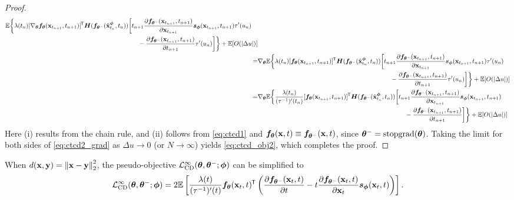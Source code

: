 \begin{appendices}
\begin{proof}
\begin{align}
\begin{multlined}[t][0.9\displaywidth]
            \mbb{E}\bigg\{\lambda(t_n)[\nabla_\vtheta \vf_\vtheta(\rvx_{t_{n+1}}, t_{n+1})]\tran \mH(\vf_{\vtheta^{-}}(\hat{\rvx}_{t_n}^\vphi, t_n))\bigg[t_{n+1} \frac{\partial \vf_{\vtheta^-}(\rvx_{t_{n+1}}, t_{n+1})}{\partial \rvx_{t_{n+1}}}\vs_\vphi(\rvx_{t_{n+1}}, t_{n+1})\tau'(u_{n}) \\ - \frac{\partial \vf_{\vtheta^-}(\rvx_{t_{n+1}}, t_{n+1})}{\partial t_{n+1}}\tau'(u_{n})\bigg]\bigg\} + \mbb{E}[O(|\Delta u|)]
        \end{multlined}\notag \\
        =&\!\begin{multlined}[t][0.9\displaywidth]
            \nabla_\vtheta \mbb{E}\bigg\{\lambda(t_n)[\vf_\vtheta(\rvx_{t_{n+1}}, t_{n+1})]\tran \mH(\vf_{\vtheta^{-}}(\hat{\rvx}_{t_n}^\vphi, t_n))\bigg[t_{n+1} \frac{\partial \vf_{\vtheta^-}(\rvx_{t_{n+1}}, t_{n+1})}{\partial \rvx_{t_{n+1}}}\vs_\vphi(\rvx_{t_{n+1}}, t_{n+1})\tau'(u_{n}) \\ - \frac{\partial \vf_{\vtheta^-}(\rvx_{t_{n+1}}, t_{n+1})}{\partial t_{n+1}}\tau'(u_{n})\bigg]\bigg\} + \mbb{E}[O(|\Delta u|)]
        \end{multlined}\\\notag
        =&\!\begin{multlined}[t][0.9\displaywidth]
            \nabla_\vtheta \mbb{E}\bigg\{\frac{\lambda(t_n)}{(\tau^{-1})'(t_{n})}[\vf_\vtheta(\rvx_{t_{n+1}}, t_{n+1})]\tran \mH(\vf_{\vtheta^{-}}(\hat{\rvx}_{t_n}^\vphi, t_n))\bigg[t_{n+1} \frac{\partial \vf_{\vtheta^-}(\rvx_{t_{n+1}}, t_{n+1})}{\partial \rvx_{t_{n+1}}}\vs_\vphi(\rvx_{t_{n+1}}, t_{n+1}) \\ - \frac{\partial \vf_{\vtheta^-}(\rvx_{t_{n+1}}, t_{n+1})}{\partial t_{n+1}}\bigg]\bigg\} + \mbb{E}[O(|\Delta u|)]
        \end{multlined}\label{eq:ctcd2_grad}
    \end{align}
    Here (i) results from the chain rule, and (ii) follows from \cref{eq:ctcd1} and ${\bm{f}}_{\bm{\theta}}({\mathbf{x}}, t) \equiv {\bm{f}}_{{\bm{\theta}}^{-}}({\mathbf{x}}, t)$, since ${\bm{\theta}}^{-} = \operatorname{stopgrad}({\bm{\theta}})$. Taking the limit for both sides of \cref{eq:ctcd2_grad} as $\Delta u \to 0$ (or $N\to\infty$) yields \cref{eq:ctcd_obj2}, which completes the proof.
\end{proof}
\begin{remark}
    When $d({\mathbf{x}}, {\mathbf{y}}) = \left\lVert{\mathbf{x}} - {\mathbf{y}}\right\rVert_2^2$, the pseudo-objective $\mathcal{L}_\text{CD}^\infty ({\bm{\theta}}, {\bm{\theta}}^{-}; {\bm{\phi}})$ can be simplified to
    \begin{align}
        \mcal{L}_\text{CD}^{\infty} (\vtheta, \vtheta^{-}; \vphi) = 2 \mbb{E}\left[\frac{\lambda(t)}{(\tau^{-1})'(t)}\vf_\vtheta(\rvx_t, t) \tran \left(\frac{\partial \vf_{\vtheta^-}(\rvx_t, t)}{\partial t} - t \frac{\partial \vf_{\vtheta^-}(\rvx_t, t)}{\partial \rvx_t} \vs_\vphi(\rvx_{t}, t)\right)\right].

\end{align}
\end{remark}
\end{appendices}

